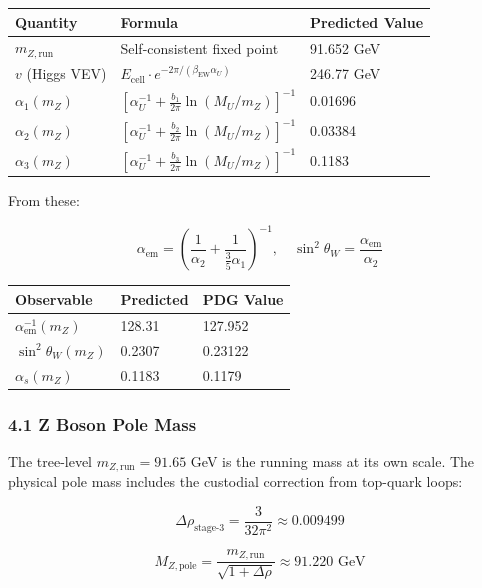 {\def\LTcaptype{none} %
\begin{longtable}[]{@{}lll@{}}
\toprule\noalign{}
Quantity & Formula & Predicted Value \\
\midrule\noalign{}
\endhead
\bottomrule\noalign{}
\endlastfoot
\(m_{Z,\text{run}}\) & Self-consistent fixed point & 91.652 GeV \\
\(v\) (Higgs VEV) & \(E_{\text{cell}} \cdot e^{-2\pi/(\beta_{\text{EW}} \alpha_U)}\) & 246.77 GeV \\
\(\alpha_1(m_Z)\) & \([\alpha_U^{-1} + \frac{b_1}{2\pi}\ln(M_U/m_Z)]^{-1}\) & 0.01696 \\
\(\alpha_2(m_Z)\) & \([\alpha_U^{-1} + \frac{b_2}{2\pi}\ln(M_U/m_Z)]^{-1}\) & 0.03384 \\
\(\alpha_3(m_Z)\) & \([\alpha_U^{-1} + \frac{b_3}{2\pi}\ln(M_U/m_Z)]^{-1}\) & 0.1183 \\
\end{longtable}
}

From these:

\[\alpha_{\text{em}} = \left(\frac{1}{\alpha_2} + \frac{1}{\frac{3}{5}\alpha_1}\right)^{-1}, \quad \sin^2\theta_W = \frac{\alpha_{\text{em}}}{\alpha_2}\]

{\def\LTcaptype{none} %
\begin{longtable}[]{@{}lll@{}}
\toprule\noalign{}
Observable & Predicted & PDG Value \\
\midrule\noalign{}
\endhead
\bottomrule\noalign{}
\endlastfoot
\(\alpha_{\text{em}}^{-1}(m_Z)\) & 128.31 & 127.952 \\
\(\sin^2\theta_W(m_Z)\) & 0.2307 & 0.23122 \\
\(\alpha_s(m_Z)\) & 0.1183 & 0.1179 \\
\end{longtable}
}

\subsubsection{4.1 Z Boson Pole Mass}\label{41-z-boson-pole-mass}

The tree-level \(m_{Z,\text{run}} = 91.65\) GeV is the running mass at its own scale. The physical pole mass includes the custodial correction from top-quark loops:

\[\Delta\rho_{\text{stage-3}} = \frac{3}{32\pi^2} \approx 0.009499\]

\[M_{Z,\text{pole}} = \frac{m_{Z,\text{run}}}{\sqrt{1 + \Delta\rho}} \approx 91.220 \text{ GeV}\]

